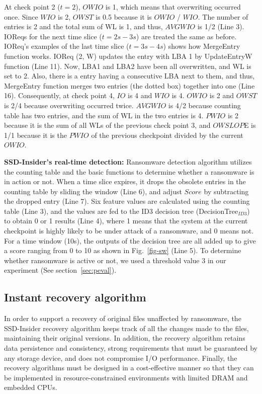 \documentclass[conference]{IEEEtran}
\newcommand{\ours}{SSD-Insider}
\begin{document}
At check point 2 ($t=2$), $OWIO$ is 1, which means that overwriting occurred once. 
Since $WIO$ is 2, $OWST$ is 0.5 because it is $OWIO$ / $WIO$. 
The number of entries is 2 and the total sum of WL is 1, and thus, $AVGWIO$ is 1/2 (Line 3). 
IOReqs for the next time slice ($t=2s-3s$) are treated the same as before. 
IOReq's examples of the last time slice ($t=3s-4s$) shows how MergeEntry function works.
IOReq (2, W) updates the entry with LBA 1 by UpdateEntryW function (Line 11). 
Now, LBA1 and LBA2 have been all overwritten, and WL is set to 2. 
Also, there is a entry having a consecutive LBA next to them, and thus,
MergeEntry function merges two entries (the dotted box) together into one (Line 16).
Consequently, at check point 4, $IO$ is 4 and $WIO$ is 4. $OWIO$ is 2 and $OWST$ is 2/4 because overwriting occurred twice. $AVGWIO$ is 4/2 because counting table has two entries,
and the sum of WL in the two entries is 4. $PWIO$ is 2 because it is the sum of 
all WLs of the previous check point 3, and $OWSLOP$E is 1/1 because it is the $PWIO$ of 
the previous checkpoint divided by the current $OWIO$.

{\bf \ours{}'s real-time detection:} Ransomware detection algorithm utilizes
the counting table and the basic functions to determine whether a ransomware is in action or not. 
When a time slice expires, 
it drops the obsolete entries in the counting table by sliding the window (Line 6),
and adjust $Score$ by subtracting the dropped entry (Line 7).
Six feature values are calculated using the counting table (Line 3),
and the values are fed to the ID3 decision tree (DecisionTree$_{ID3}$) to obtain 0 or 1 results (Line 4),
where 1 means that the system at the current checkpoint is highly likely to be under attack
of a ransomware, and 0 means not. For a time window (10s), the outputs of the decision tree are all added up to 
give a score ranging from 0 to 10 as shown in Fig.~\ref{fig-sw} (Line 5). 
To determine whether ransomware is active or not, we used
a threshold value 3 in our experiment (See section~\ref{sec:peval}).



\subsection{Instant recovery algorithm}

\label{sec:recovery}
In order to support a recovery of original files unaffected by
ransomware, the \ours{} recovery algorithm keeps track of all
the changes made to the files, maintaining their original versions.
In addition, the recovery algorithm retains data persistence and
consistency, strong requirements that must be guaranteed by any
storage device, and does not compromise I/O performance.  Finally,
the recovery algorithms must be designed in a cost-effective manner
so that they can be implemented in resource-constrained
environments with limited DRAM and embedded CPUs.  
\end{document}
